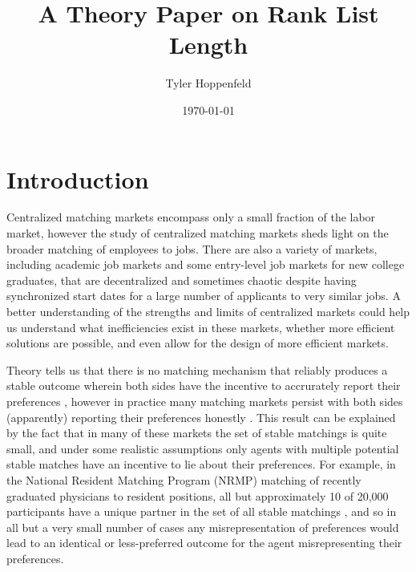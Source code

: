 \documentclass[WP]{AEA}
\begin{document}
\title{A Theory Paper on Rank List Length}
\author{Tyler Hoppenfeld}
\date{\today}
\JEL{}
\Keywords{}


\maketitle


\section{Introduction}

Centralized matching markets encompass only a small fraction of the labor market, however the study of centralized matching markets  sheds light on the broader matching of employees to jobs. There are also a variety of markets, including academic job markets and some entry-level job markets for new college graduates, that are decentralized and sometimes chaotic despite having synchronized start dates for a large number of applicants to very similar jobs. A better understanding of the strengths and limits of centralized markets could help us understand what inefficiencies exist in these markets, whether more efficient solutions are possible, and even allow for the design of more efficient markets. 

Theory tells us that there is no matching mechanism that reliably produces a stable outcome wherein both sides have the incentive to accrurately report their preferences \citep{Roth1985}, however in practice many matching markets persist with both sides (apparently) reporting their preferences honestly  \citep{Roth1991}. This result can be explained by the fact that in many of these markets the set of stable matchings is quite small, and under some realistic assumptions only agents with multiple potential stable matches have an incentive to lie about their preferences.  For example, in the National Resident Matching Program (NRMP) matching of recently graduated physicians to resident positions, all but approximately 10 of 20,000 participants have a unique partner in the set of all stable matchings \citep{Roth1999a}, and so in all but a very small number of cases any misrepresentation of preferences would lead to an identical or less-preferred outcome for the agent misrepresenting their preferences. 
\end{document}
